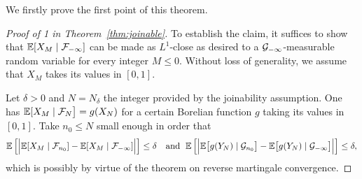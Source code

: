 \documentclass[12pt,a4paper]{article}
\begin{document}
We firstly prove the first point of this theorem. 

\begin{proof}[Proof of 1 in Theorem~\ref{thm:joinable}]
To establish the claim, it suffices to show that 
$\mathbb{E}[X_{M} \mid \mathcal{F}_{-\infty}]$ can be made as $L^1$-close as desired to a 
$\mathcal{G}_{-\infty}$-measurable random variable for every integer $M \leq 0$. 
Without loss of generality, we assume that $X_M$ takes its values in $[0,1]$. 

Let $\delta>0$ and $N = N_\delta$ the integer provided by the joinability assumption. 
One has 
$\mathbb{E}[X_M \mid \mathcal{F}_{N}\bigr] = g(X_{N})$ 
for a certain Borelian function $g$ taking its values in $[0,1]$. 
Take $n_0 \leq N$ small enough in order that 
$$
\mathbb{E}\left[ \Bigr| 
\mathbb{E}[X_M \mid \mathcal{F}_{n_0}] - \mathbb{E}[X_M \mid \mathcal{F}_{-\infty}] 
\Bigl| \right] 
\leq \delta
\quad \text{and }\; 
\mathbb{E}\left[ \Bigr| 
\mathbb{E}\bigl[g(Y_N) \mid \mathcal{G}_{n_0}\bigr] - \mathbb{E}\bigl[g(Y_N) \mid \mathcal{G}_{-\infty}\bigr]
\Bigl| \right] 
\leq \delta,
$$
which is possibly by virtue of the theorem on reverse martingale convergence. 


\end{proof}
\end{document}
